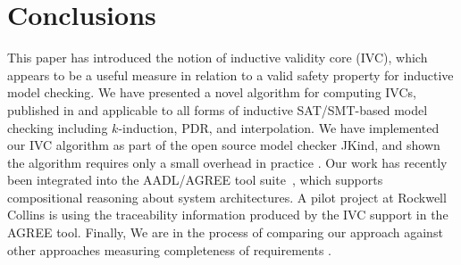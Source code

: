 \section{Conclusions}
\label{sec:conclusion}
This paper has introduced the notion of inductive validity core (IVC), which
appears to be a useful measure in relation to a valid safety property
for inductive model checking. We have presented a novel algorithm for
computing IVCs, published in \cite{Ghass16} and
applicable to all forms of inductive SAT/SMT-based model checking
including $k$-induction, PDR, and interpolation. We have implemented our IVC algorithm as part of the open source model
checker JKind, and shown the algorithm requires only a
small overhead in practice \cite{Ghass16, expr}. Our work has recently been integrated into the AADL/AGREE tool
suite~\cite{QFCS15:backes, hilt2013}, which supports compositional
reasoning about system architectures. A pilot project at Rockwell
Collins is using the traceability information produced by the IVC
support in the AGREE tool. Finally, We are in the process of
comparing our approach against other approaches measuring completeness of
requirements \cite{expr}.
%


